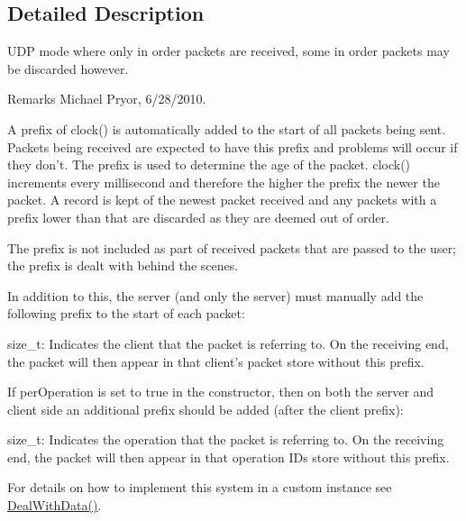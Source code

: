 \subsection{Detailed Description}
UDP mode where only in order packets are received, some in order packets may be discarded however. \begin{DoxyRemark}{Remarks}
Michael Pryor, 6/28/2010.
\end{DoxyRemark}
A prefix of clock() is automatically added to the start of all packets being sent. Packets being received are expected to have this prefix and problems will occur if they don't. The prefix is used to determine the age of the packet. clock() increments every millisecond and therefore the higher the prefix the newer the packet. A record is kept of the newest packet received and any packets with a prefix lower than that are discarded as they are deemed out of order.\par
\par


The prefix is not included as part of received packets that are passed to the user; the prefix is dealt with behind the scenes.\par
\par


In addition to this, the server (and only the server) must manually add the following prefix to the start of each packet:
\begin{DoxyItemize}
\item size\_\-t: Indicates the client that the packet is referring to. On the receiving end, the packet will then appear in that client's packet store without this prefix.\par
\par

\end{DoxyItemize}

If perOperation is set to true in the constructor, then on both the server and client side an additional prefix should be added (after the client prefix):
\begin{DoxyItemize}
\item size\_\-t: Indicates the operation that the packet is referring to. On the receiving end, the packet will then appear in that operation IDs store without this prefix.\par
\par

\end{DoxyItemize}

For details on how to implement this system in a custom instance see \hyperlink{class_net_mode_udp_per_client_a0d7d2c68e11b088b743069d3848a13f0}{DealWithData()}.\par
\par


